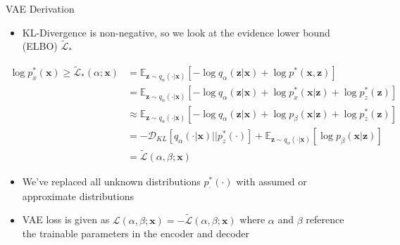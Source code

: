 \documentclass{beamer}
\newcommand{\vect}[1]{\boldsymbol{#1}}
\theoremstyle{definition}
\begin{document}
\begin{frame}{VAE Derivation}
  \scriptsize
  \begin{itemize}
    \item KL-Divergence is non-negative, so we look at the evidence lower bound (ELBO) $\tilde{\mathcal{L}}_*$
  \end{itemize}
  \begin{equation*}
  \begin{split}
    \log p_x^* (\vect x) \geq \tilde{\mathcal{L}}_*(\alpha; \vect x)  &= \mathbb{E}_{\vect z\sim q_\alpha(\cdot | \vect x)}\left[ -\log q_\alpha(\vect z | \vect x) + \log p^*(\vect x, \vect z) \right] \\
    &= \mathbb{E}_{\vect z\sim q_\alpha(\cdot | \vect x)}\left[ -\log q_\alpha(\vect z | \vect x) + \log p_x^*(\vect x | \vect z) + \log p_z^*(\vect z) \right] \\
  &\approx \mathbb{E}_{\vect z\sim q_\alpha(\cdot | \vect x)}\left[ -\log q_\alpha(\vect z | \vect x) + \log p_\beta(\vect x | \vect z) + \log p_z^*(\vect z) \right] \\
  &= -\mathcal{D}_{KL}\left[ q_\alpha(\cdot | \vect x) \big|\big| p_z^*(\cdot) \right] + \mathbb{E}_{\vect z\sim q_\alpha(\cdot | \vect x)}\left[ \log p_\beta(\vect x | \vect z) \right] \\
  &= \tilde{\mathcal{L}}(\alpha, \beta; \vect x)
  \label{eq:elbo}
\end{split}
\end{equation*}

\begin{itemize}
  \item We've replaced all unknown distributions $p_\cdot^*(\cdot)$ with assumed or approximate distributions
  \item VAE loss is given as $\mathcal{L}(\alpha,\beta;\vect x) = - \tilde{\mathcal{L}}(\alpha, \beta; \vect x)$ where $\alpha$ and $\beta$ reference the trainable parameters in the encoder and decoder
\end{itemize}
\end{frame}
\end{document}
